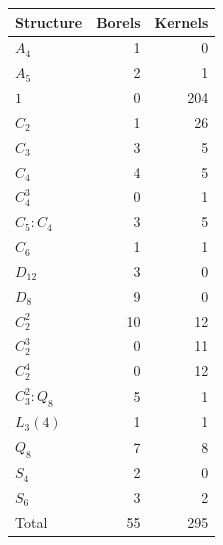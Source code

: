 \begin{tabular}{lrr}\toprule
Structure & Borels & Kernels\\\midrule
$A_4$ & 1 & 0\\
$A_5$ & 2 & 1\\
$1$ & 0 & 204\\
$C_2$ & 1 & 26\\
$C_3$ & 3 & 5\\
$C_4$ & 4 & 5\\
$C_4^3$ & 0 & 1\\
$C_5:C_4$ & 3 & 5\\
$C_6$ & 1 & 1\\
$D_{12}$ & 3 & 0\\
$D_8$ & 9 & 0\\
$C_2^2$ & 10 & 12\\
$C_2^3$ & 0 & 11\\
$C_2^4$ & 0 & 12\\
$C_3^2:Q_8$ & 5 & 1\\
$L_3(4)$ & 1 & 1\\
$Q_8$ & 7 & 8\\
$S_4$ & 2 & 0\\
$S_6$ & 3 & 2\\
\midrule Total & 55 & 295\\\bottomrule\end{tabular}

